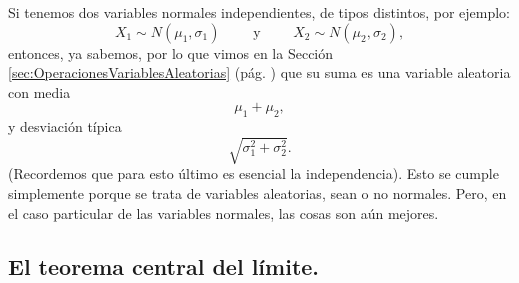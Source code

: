 Si tenemos dos variables normales independientes, de tipos distintos, por ejemplo:
\[X_1\sim N(\mu_1,\sigma_1)\qquad \mbox{ y }\qquad X_2\sim N(\mu_2,\sigma_2),\]
entonces, ya sabemos, por lo que vimos en la Sección \ref{sec:OperacionesVariablesAleatorias} (pág. \pageref{sec:OperacionesVariablesAleatorias}) que su suma es una variable aleatoria con media
\[\mu_1+\mu_2,\]
y desviación típica
\[\sqrt{\sigma_1^2+\sigma_2^2}.\]
(Recordemos que para esto último es esencial la independencia). Esto se cumple simplemente porque se trata de variables aleatorias, sean o no normales. Pero, en el caso particular de las variables normales, las cosas son aún mejores.
    \begin{center}
    \end{center}


\subsection{El teorema central del límite.}
\label{sec:teoremaCentralLimitePrimeraVersion}

